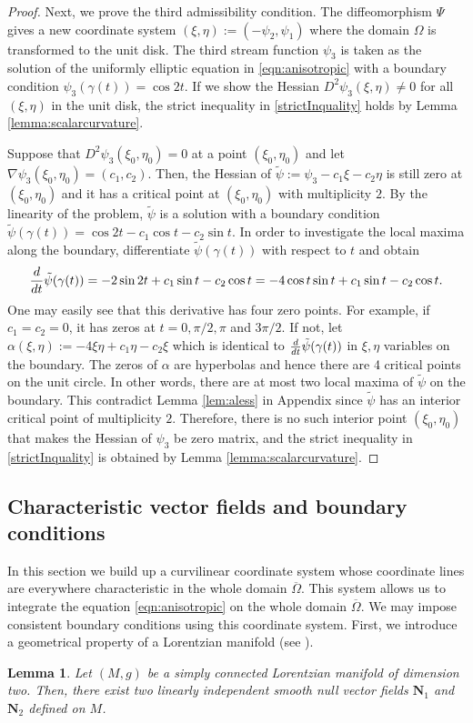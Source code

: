 \documentclass[11pt]{amsart}
\theoremstyle{plain}
\newtheorem{Lem}[Thm]{Lemma}
\numberwithin{equation}{section}
\numberwithin{Thm}{section}
\def\N{{\mathbf N}}
\begin{document}
\begin{proof}
Next, we prove the third admissibility condition. The diffeomorphism $\Psi$ gives a new coordinate system $(\xi,\eta):=(-\psi_2,\psi_1)$ where the domain $\Omega$ is  transformed to the unit disk. The third stream function $\psi_3$ is taken as the solution of the uniformly elliptic equation in \eqref{eqn:anisotropic} with a boundary condition $\psi_3(\gamma(t))=\cos 2t$. If we show the Hessian $D^2\psi_3(\xi,\eta)\ne0$ for all $(\xi,\eta)$ in the unit disk, the strict inequality in \eqref{strictInquality} holds by Lemma \ref{lemma:scalarcurvature}.

Suppose that $D^2\psi_3(\xi_0,\eta_0)=0$ at a point $(\xi_0,\eta_0)$ and let $\nabla \psi_3 (\xi_0,\eta_0) = (c_1,c_2)$. Then, the Hessian of $\tilde\psi:=\psi_3 - c_1\xi - c_2\eta$ is still zero at $(\xi_0,\eta_0)$ and it has a critical point at $(\xi_0,\eta_0)$ with multiplicity $2$. By the linearity of the problem, $\tilde\psi$ is a solution with a boundary condition $\tilde\psi(\gamma(t)) = \cos 2t - c_1\cos t - c_2\sin t$. In order to investigate the local maxima along the boundary, differentiate $\tilde\psi(\gamma(t))$ with respect to $t$ and obtain
$$
{d\over dt}\tilde\psi(\gamma(t))= -2\sin 2t + c_1\sin t - c_2\cos t =-4\cos t  \sin  t  + c_1\sin t  - c_2\cos t .
$$
One may easily see that this derivative has four zero points. For example, if $c_1=c_2=0$, it has zeros at $t=0,{\pi/2},\pi$ and $3\pi/2$. If not, let $\alpha(\xi,\eta):=-4\xi\eta + c_1\eta-c_2\xi$ which is identical to ${d\over dt}\tilde\psi(\gamma(t))$ in $\xi,\eta$ variables on the boundary. The zeros of $\alpha$ are hyperbolas and hence there are 4 critical points on the unit circle. In other words, there are at most two local maxima of $\tilde\psi$ on the boundary. This contradict Lemma \ref{lem:aless} in Appendix since $\tilde\psi$ has an interior critical point of multiplicity $2$. Therefore, there is no such interior point $(\xi_0,\eta_0)$ that makes the Hessian of $\psi_3$ be zero matrix, and the strict inequality in \eqref{strictInquality} is obtained by Lemma \ref{lemma:scalarcurvature}.
\end{proof}


\subsection{Characteristic vector fields and boundary conditions}\label{sect.char}

In this section we build up a curvilinear coordinate system whose coordinate lines are everywhere characteristic in the whole domain $\overline\Omega$. This system allows us to integrate the equation \eqref{eqn:anisotropic} on the whole domain $\overline\Omega$. We may impose consistent boundary conditions using this coordinate system. First, we introduce a geometrical property of a Lorentzian manifold (see \cite[Proposition 3.37]{MR1384756}).
\begin{Lem}\label{lemma:GHL}
Let $(M,g)$ be a simply connected Lorentzian manifold of dimension two. Then, there exist two linearly independent smooth null vector fields $\N_1$ and $\N_2$ defined on $M$.
\end{Lem}
\end{document}
